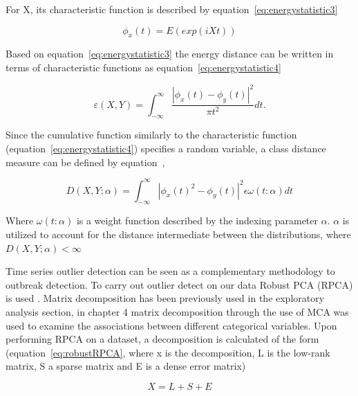 For X, its characteristic function is described by equation~\ref{eq:energystatistic3}

\begin{equation} 
\phi_{x}(t)=E(exp(iXt))
\label{eq:energystatistic3}  \end{equation}

Based on equation~\ref{eq:energystatistic3} the energy distance can be written in terms of characteristic functions as equation~\ref{eq:energystatistic4} 

\begin{equation} 
\varepsilon (X,Y) =\int_{-\infty}^{\infty} \frac{|\phi_{x}(t)-\phi_{y}(t)|^2}{\pi t^2} dt.
\label{eq:energystatistic4}  \end{equation} 

Since the cumulative function similarly to the characteristic function (equation~\ref{eq:energystatistic4}) specifies a random variable, a class distance measure can be defined by equation~\label{eq:energystatistic5},

\begin{equation} 
D(X,Y;\alpha)=\int_{-\infty}^{\infty}|\phi_x(t)^2-\phi_y(t)|^2 \epsilon \omega(t:\alpha) dt
\label{eq:energystatistic5}  \end{equation} 

Where $\omega(t:\alpha)$ is a weight function described by the indexing parameter $\alpha$. $\alpha$ is utilized to account for the distance intermediate between the distributions, where $D(X,Y;\alpha)<\infty$

Time series outlier detection can be seen  as a complementary methodology to outbreak detection. To carry out outlier detect on our data Robust PCA (RPCA) is used \citep{zhou2010stable}. Matrix decomposition has been previously used in the exploratory analysis section, in chapter 4 matrix decomposition through the use of MCA was used to examine the associations between different categorical variables. Upon performing RPCA on a dataset, a decomposition is calculated of the form (equation~\ref{eq:robustRPCA}, where x is the decomposition, L is the low-rank matrix, S a sparse matrix and E is a dense error matrix)

\begin{equation} 
X =L+S+E
\label{eq:robustRPCA}  \end{equation} 

